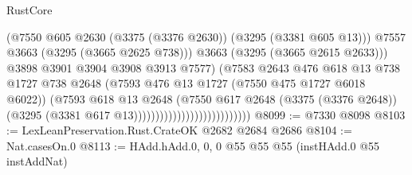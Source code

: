 \begin{lexlean}{RustCore}
\begin{coremodule}
                                                      (@7550
                                                        @605
                                                        @2630
                                                        (@3375 (@3376 @2630))
                                                        (@3295 (@3381 @605 @13)))
                                                      @7557
                                                      @3663
                                                      (@3295 (@3665 @2625 @738)))
                                                    @3663
                                                    (@3295 (@3665 @2615 @2633)))
                                                  @3898
                                                  @3901
                                                  @3904
                                                  @3908
                                                  @3913
                                                  @7577)
                                                (@7583
                                                  @2643
                                                  @476
                                                  @618
                                                  @13
                                                  @738
                                                  @1727
                                                  @738
                                                  @2648
                                                  (@7593
                                                    @476
                                                    @13
                                                    @1727
                                                    (@7550 @475 @1727 @6018 @6022))
                                                  (@7593
                                                    @618
                                                    @13
                                                    @2648
                                                    (@7550
                                                      @617
                                                      @2648
                                                      (@3375 (@3376 @2648))
                                                      (@3295
                                                        (@3381 @617 @13)))))))))))))))))))))))))))
@8099 := @7330 @8098
@8103 := LexLeanPreservation.Rust.CrateOK @2682 @2684 @2686
@8104 := Nat.casesOn.{0}
@8113 := HAdd.hAdd.{0, 0, 0} @55 @55 @55 (instHAdd.{0} @55 instAddNat)

\end{coremodule}
\end{lexlean}
